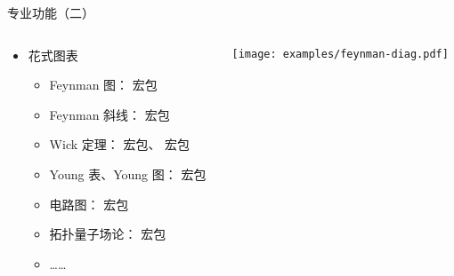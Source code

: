 \begin{frame}{专业功能（二）}
\begin{columns}
\begin{column}{0.65\textwidth}
  \begin{itemize}
    \item 花式图表

      \begin{itemize}
        \item Feynman 图： 宏包%
        \item Feynman 斜线： 宏包
        \item Wick 定理： 宏包、 宏包
        \item Young 表、Young 图： 宏包
        \item 电路图： 宏包
        \item 拓扑量子场论： 宏包
        \item ……
      \end{itemize}
  \end{itemize}
\end{column} \pause
\begin{column}{0.3\textwidth}
  \hspace{-0.15\textwidth}
  \texttt{[image: examples/feynman-diag.pdf]}
\end{column}
\end{columns}
\end{frame}

